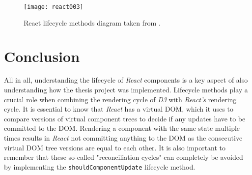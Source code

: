 \begin{figure}
  \centering
  \texttt{[image: react003]}
  \caption{React lifecycle methods diagram taken from \cite{ReactRenderCycleDiagram}.}
  \label{fig:reactLifecycleMethods}
\end{figure}

\section{Conclusion}

All in all, understanding the lifecycle of \emph{React} components is a key aspect of also understanding how the thesis project was implemented. Lifecycle methods play a crucial role when combining the rendering cycle of \emph{D3} with \emph{React's} rendering cycle. It is essential to know that \emph{React} has a virtual DOM, which it uses to compare versions of virtual component trees to decide if any updates have to be committed to the DOM. Rendering a component with the same state multiple times results in \emph{React} not committing anything to the DOM as the consecutive virtual DOM tree versions are equal to each other. It is also important to remember that these so-called "reconciliation cycles" can completely be avoided by implementing the \texttt{shouldComponentUpdate} lifecycle method.






